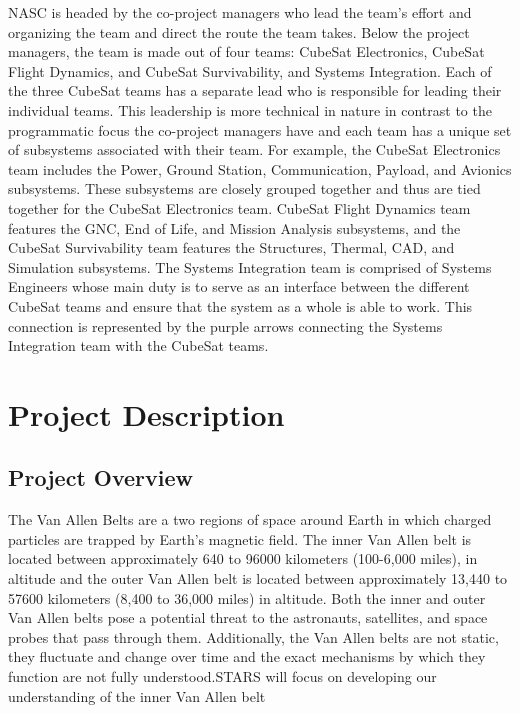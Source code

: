 \documentclass[3p]{elsarticle}
\begin{document}
NASC is headed by the co-project managers who lead the team's effort and organizing the team and direct the route the team takes. Below the project managers, the team is made out of four teams: CubeSat Electronics, CubeSat Flight Dynamics, and CubeSat Survivability, and Systems Integration. Each of the three CubeSat teams has a separate lead who is responsible for leading their individual teams. This leadership is more technical in nature in contrast to the programmatic focus the co-project managers have and each team has a unique set of subsystems associated with their team. For example, the CubeSat Electronics team includes the Power, Ground Station, Communication, Payload, and Avionics subsystems. These subsystems are closely grouped together and thus are tied together for the CubeSat Electronics team. CubeSat Flight Dynamics team features the GNC, End of Life, and Mission Analysis subsystems, and the CubeSat Survivability team features the Structures, Thermal, CAD, and Simulation subsystems. The Systems Integration team is comprised of Systems Engineers whose main duty is to serve as an interface between the different CubeSat teams and ensure that the system as a whole is able to work. This connection is represented by the purple arrows connecting the Systems Integration team with the CubeSat teams. 
\section{Project Description}
\subsection{Project Overview}

The Van Allen Belts are a two regions of space around Earth in which charged particles are trapped by Earth's magnetic field. The inner Van Allen belt is located between approximately 640 to 96000 kilometers (100-6,000 miles), in altitude and the outer Van Allen belt is located between approximately 13,440 to 57600 kilometers (8,400 to 36,000 miles) in altitude. \cite{VanAllen_1} Both the inner and outer Van Allen belts pose a potential threat to the astronauts, satellites, and space probes that pass through them. Additionally, the Van Allen belts are not static, they fluctuate and change over time and the exact mechanisms by which they function are not fully understood.STARS will focus on developing our understanding of the inner Van Allen belt
\end{document}
